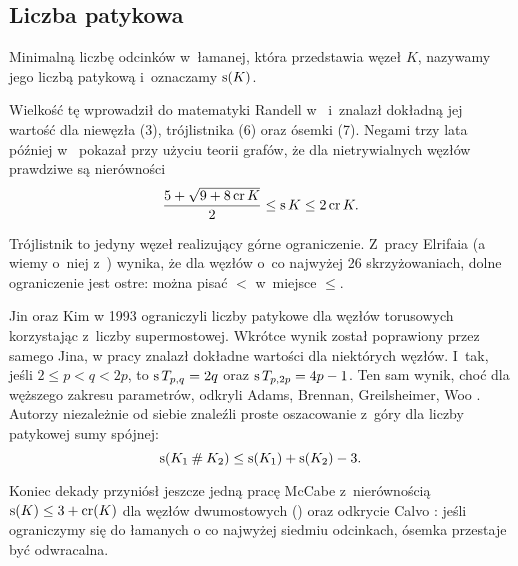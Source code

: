 
\subsection{Liczba patykowa}


\begin{definition}
    Minimalną liczbę odcinków w~łamanej, która przedstawia węzeł $K$, nazywamy jego liczbą patykową i~oznaczamy $\operatorname{s}(K)$.
\end{definition}

Wielkość tę wprowadził do matematyki Randell w~\cite{randell98} i~znalazł dokładną jej wartość dla niewęzła (3), trójlistnika (6) oraz ósemki (7).
%
Negami trzy lata później w~\cite{negami91} pokazał przy użyciu teorii grafów, że dla nietrywialnych węzłów prawdziwe są nierówności
%
\begin{equation}
    \frac{5+\sqrt{9 + 8 \operatorname{cr} K}}{2} \le \operatorname{s} K \le 2 \operatorname{cr} K.
\end{equation}

Trójlistnik to jedyny węzeł realizujący górne ograniczenie.
Z~pracy Elrifaia \cite{elrifai06} (a wiemy o~niej z~\cite[s. 1]{huh11}) wynika, że dla węzłów o~co najwyżej 26 skrzyżowaniach, dolne ograniczenie jest ostre: można pisać $<$ w~miejsce $\le$.
%

Jin oraz Kim w 1993 ograniczyli liczby patykowe dla węzłów torusowych korzystając z~liczby supermostowej.
%
%
Wkrótce wynik został poprawiony przez samego Jina, w pracy \cite{jin97} znalazł dokładne wartości dla niektórych węzłów.
I~tak, jeśli $2 \le p < q < 2p$, to $\operatorname{s} T_{p,q} = 2q$ oraz $\operatorname{s} T_{p, 2p} = 4p-1$.
Ten sam wynik, choć dla węższego zakresu parametrów, odkryli Adams, Brennan, Greilsheimer, Woo \cite{greilsheimer97}.
%
%
%
%
%
Autorzy niezależnie od siebie znaleźli proste oszacowanie z~góry dla liczby patykowej sumy spójnej:
\begin{equation}
    \operatorname{s}(K_1 \mathbin{\#} K_2) \le \operatorname{s}(K_1) + \operatorname{s}(K_2) - 3.
\end{equation}

Koniec dekady przyniósł jeszcze jedną pracę McCabe z~nierównością $\operatorname{s}(K) \le 3 + \operatorname{cr} (K)$ dla węzłów dwumostowych (\cite{mccabe98}) oraz odkrycie Calvo \cite{calvo01}: jeśli ograniczymy się do łamanych o co najwyżej siedmiu odcinkach, ósemka przestaje być odwracalna.
%
%

